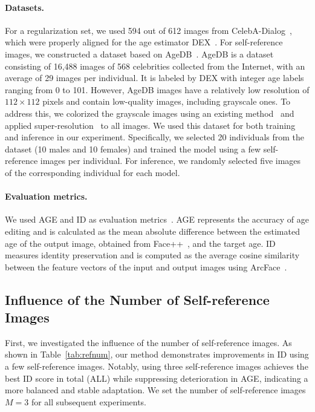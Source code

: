 \paragraph{Datasets.}
For a regularization set, we used 594 out of 612 images from CelebA-Dialog~\cite{jiang2021talk}, which were properly aligned for the age estimator DEX~\cite{rothe2015dex}.
For self-reference images, we constructed a dataset based on AgeDB~\cite{moschoglou2017agedb}.
AgeDB is a dataset consisting of 16,488 images of 568 celebrities collected from the Internet, with an average of 29 images per individual.
It is labeled by DEX with integer age labels ranging from 0 to 101.
However, AgeDB images have a relatively low resolution of $112\times112$ pixels and contain low-quality images, including grayscale ones.
To address this, we colorized the grayscale images using an existing method~\cite{kang2023ddcolor} and applied super-resolution~\cite{lin2024diffbir} to all images.
We used this dataset for both training and inference in our experiment. 
Specifically, we selected 20 individuals from the dataset (10 males and 10 females) and trained the model using a few self-reference images per individual.
For inference, we randomly selected five images of the corresponding individual for each model. 

\paragraph{Evaluation metrics.}
We used AGE and ID as evaluation metrics~\cite{alaluf2021only}.
AGE represents the accuracy of age editing and is calculated as the mean absolute difference between the estimated age of the output image, obtained from Face++~\cite{facepp}, and the target age. 
ID measures identity preservation and is computed as the average cosine similarity between the feature vectors of the input and output images using ArcFace~\cite{deng2019arcface}.

\subsection{
Influence of the Number of Self-reference Images
}
\label{sec:eval_refnum}


First, we investigated the influence of the number of self-reference images.
As shown in Table~\ref{tab:refnum}, our method demonstrates improvements in ID using a few self-reference images. 
Notably, using three self-reference images achieves the best ID score in total (ALL) while suppressing deterioration in AGE, indicating a more balanced and stable adaptation. We set the number of self-reference images $M=3$ for all subsequent experiments. 


